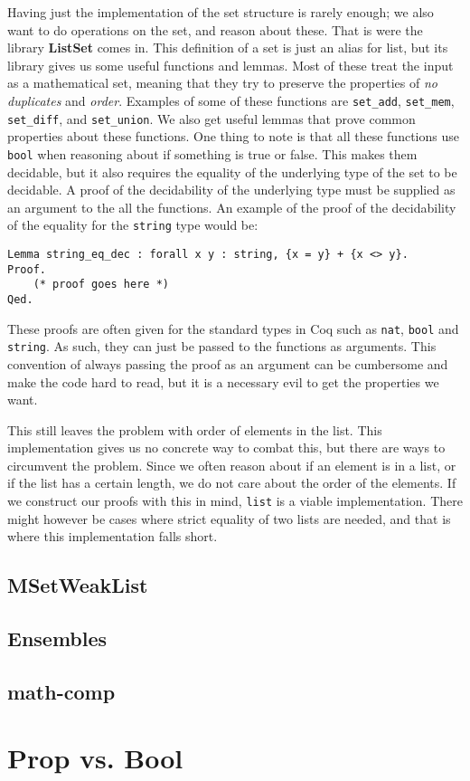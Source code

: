 Having just the implementation of the set structure is rarely enough; we also want to do operations on the set, and reason about these.
That is were the library \textbf{ListSet} comes in. This definition of a set is just an alias for list, but its library gives us
some useful functions and lemmas. Most of these treat the input as a mathematical set, meaning that they try to preserve
the properties of \textit{no duplicates} and \textit{order}.
Examples of some of these functions are \texttt{set_add}, \texttt{set_mem}, \texttt{set_diff}, and \texttt{set_union}.
We also get useful lemmas that prove common properties about these functions.
One thing to note is that all these functions use \texttt{bool} when reasoning about if something is true or false.
This makes them decidable, but it also requires the equality of the underlying type of the set to be decidable.
A proof of the decidability of the underlying type must be supplied as an argument to the all the functions.
An example of the proof of the decidability of the equality for the \texttt{string} type would be:
\begin{verbatim}
Lemma string_eq_dec : forall x y : string, {x = y} + {x <> y}.
Proof.
    (* proof goes here *)
Qed.
\end{verbatim}

These proofs are often given for the standard types in Coq such as \texttt{nat}, \texttt{bool} and \texttt{string}.
As such, they can just be passed to the functions as arguments.
This convention of always passing the proof as an argument can be cumbersome and make the code hard to read,
but it is a necessary evil to get the properties we want.

This still leaves the problem with order of elements in the list. This implementation gives us no concrete way to combat this,
but there are ways to circumvent the problem. Since we often reason about if an element is in a list, or if the list has
a certain length, we do not care about the order of the elements. If we construct our proofs with this in mind, \texttt{list} is a viable
implementation. There might however be cases where strict equality of two lists are needed, and that is where this implementation falls short.

\subsection{MSetWeakList}

\subsection{Ensembles}

\subsection{math-comp}


\section{Prop vs. Bool}
